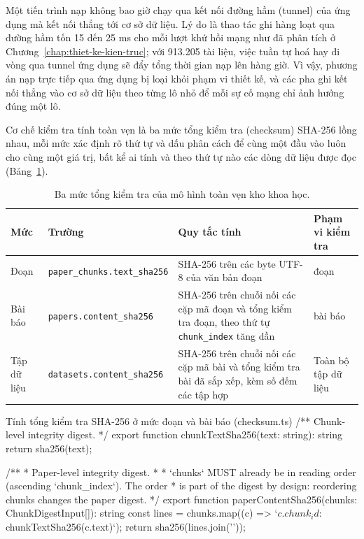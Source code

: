 Một tiến trình nạp không bao giờ chạy qua kết nối đường hầm (tunnel) của ứng dụng mà kết nối thẳng tới cơ sở dữ liệu. Lý do là thao tác ghi hàng loạt qua đường hầm tốn 15 đến 25 ms cho mỗi lượt khứ hồi mạng như đã phân tích ở Chương~\ref{chap:thiet-ke-kien-truc}; với 913.205 tài liệu, việc tuần tự hoá hay đi vòng qua tunnel ứng dụng sẽ đẩy tổng thời gian nạp lên hàng giờ. Vì vậy, phương án nạp trực tiếp qua ứng dụng bị loại khỏi phạm vi thiết kế, và các pha ghi kết nối thẳng vào cơ sở dữ liệu theo từng lô nhỏ để mỗi sự cố mạng chỉ ảnh hưởng đúng một lô.

Cơ chế kiểm tra tính toàn vẹn là ba mức tổng kiểm tra (checksum) SHA-256 lồng nhau, mỗi mức xác định rõ thứ tự và dấu phân cách để cùng một đầu vào luôn cho cùng một giá trị, bất kể ai tính và theo thứ tự nào các dòng dữ liệu được đọc (Bảng~\ref{tab:ba-muc-checksum}).

\begin{table}[H]
    \centering
    \caption{Ba mức tổng kiểm tra của mô hình toàn vẹn kho khoa học.}
    \label{tab:ba-muc-checksum}
    \small
    \begin{tabularx}{\textwidth}{@{}>{\raggedright\arraybackslash}p{2.0cm}>{\raggedright\arraybackslash}p{4.1cm}>{\raggedright\arraybackslash}X>{\raggedright\arraybackslash}p{2.9cm}@{}}
        \toprule
        \textbf{Mức} & \textbf{Trường} & \textbf{Quy tắc tính} & \textbf{Phạm vi kiểm tra} \\
        \midrule
        Đoạn & \texttt{paper\_chunks.\allowbreak text\_sha256} & SHA-256 trên các byte UTF-8 của văn bản đoạn & 913.205 đoạn \\
        Bài báo & \texttt{papers.\allowbreak content\_sha256} & SHA-256 trên chuỗi nối các cặp mã đoạn và tổng kiểm tra đoạn, theo thứ tự \texttt{chunk\_index} tăng dần & 70.590 bài báo \\
        Tập dữ liệu & \texttt{datasets.\allowbreak content\_sha256} & SHA-256 trên chuỗi nối các cặp mã bài và tổng kiểm tra bài đã sắp xếp, kèm số đếm các tập hợp & Toàn bộ tập dữ liệu \\
        \bottomrule
    \end{tabularx}
\end{table}

\begin{tsbox}{Tính tổng kiểm tra SHA-256 ở mức đoạn và bài báo (checksum.ts)}
/** Chunk-level integrity digest. */
export function chunkTextSha256(text: string): string {
  return sha256(text);
}

/**
 * Paper-level integrity digest.
 *
 * `chunks` MUST already be in reading order (ascending `chunk_index`). The order
 * is part of the digest by design: reordering chunks changes the paper digest.
 */
export function paperContentSha256(chunks: ChunkDigestInput[]): string {
  const lines = chunks.map((c) => `${c.chunk_id}:${chunkTextSha256(c.text)}`);
  return sha256(lines.join('\n'));
}
\end{tsbox}

